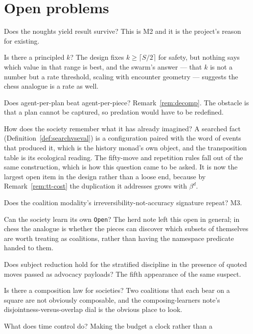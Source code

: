 \documentclass[11pt,a4paper]{article}
\theoremstyle{plain}
\theoremstyle{definition}
\theoremstyle{remark}
\begin{document}
\section{Open problems}
\label{sec:open}

\begin{description}[leftmargin=2.4em,style=nextline]
\item[Q1] Does the noughts yield result survive? This is M2 and it is the
project's reason for existing.
\item[Q2] Is there a principled $k$? The design fixes $k \geq \lceil S/2
\rceil$ for safety, but nothing says which value in that range is best, and the
swarm's answer --- that $k$ is not a number but a rate threshold, scaling with
encounter geometry --- suggests the chess analogue is a rate as well.
\item[Q3] Does agent-per-plan beat agent-per-piece? Remark~\ref{rem:decomp}.
The obstacle is that a plan cannot be captured, so predation would have to be
redefined.
\item[Q4] How does the society remember what it has already imagined? A
searched fact (Definition~\ref{def:searchvseval}) is a configuration paired
with the word of events that produced it, which is the history monad's own
object, and the transposition table is its ecological reading. The fifty-move
and repetition rules fall out of the same construction, which is how this
question came to be asked. It is now the largest open item in the design rather
than a loose end, because by Remark~\ref{rem:tt-cost} the duplication it
addresses grows with $\beta^d$.
\item[Q5] Does the coalition modality's irreversibility-not-accuracy signature
repeat? M3.
\item[Q6] Can the society learn its own \texttt{Open}? The herd note left this
open in general; in chess the analogue is whether the pieces can discover which
subsets of themselves are worth treating as coalitions, rather than having the
namespace predicate handed to them.
\item[Q7] Does subject reduction hold for the stratified discipline in the
presence of quoted moves passed as advocacy payloads? The fifth appearance of
the same suspect.
\item[Q8] Is there a composition law for societies? Two coalitions that each
bear on a square are not obviously composable, and the composing-learners note's
disjointness-versus-overlap dial is the obvious place to look.
\item[Q9] What does time control do? Making the budget a clock rather than a

\end{description}
\end{document}
